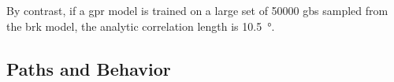 \documentclass[final,twocolumn,12pt]{elsarticle}
\begin{document}
    By contrast, if a \gls{gpr} model is trained on a large set of \num{50000} \glspl{gb} sampled from the \gls{brk} model, the analytic correlation length is \SI{10.5}{\degree}.
%	
	\subsection{ Paths and  Behavior} \label{sec:results:paths}
%	
%	
%	
% 	
%	
\end{document}
